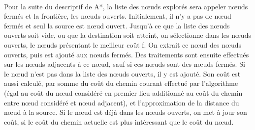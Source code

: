\documentclass[pidr]{tnreport}
\begin{document}
\paragraph{}
Pour la suite du descriptif de A*, la liste des nœuds explorés sera appeler nœuds fermés et la frontière, les nœuds ouverts. Initialement, il n'y a pas de nœud fermés et seul la source est nœud ouvert. Jusqu'à ce que la liste des nœuds ouverts soit vide, ou que la destination soit atteint, on sélectionne dans les nœuds ouverts, le nœuds présentant le meilleur coût f. On extrait ce nœud des nœuds ouverts, puis est ajouté aux nœuds fermés. Des traitements sont ensuite effectués sur les nœuds adjacents à ce nœud, sauf si ces nœuds sont des nœuds fermés. Si le nœud n'est pas dans la liste des nœuds ouverts, il y est ajouté. Son coût est aussi calculé, par somme du coût du chemin courant effectué par l'algorithme (égal au coût du nœud considéré en premier lieu additionné au coût du chemin entre nœud considéré et nœud adjacent), et l'approximation de la distance du nœud à la source. Si le nœud est déjà dans les nœuds ouverts, on met à jour son coût, si le coût du chemin actuelle est plus intéressant que le coût du nœud.
\end{document}

